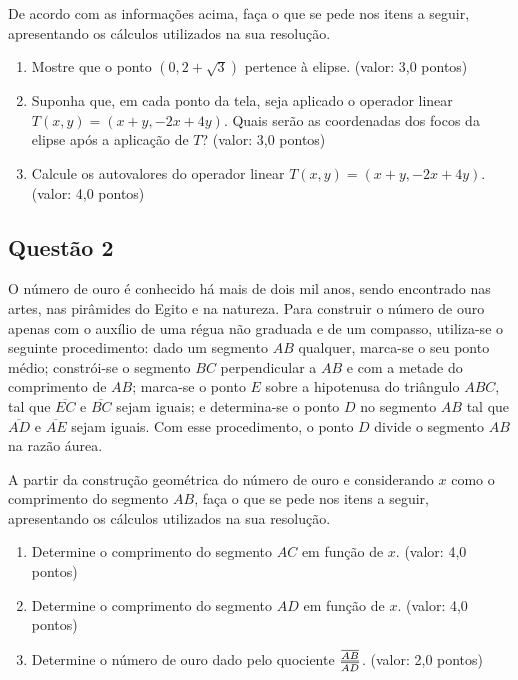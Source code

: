 \documentclass{report}
\begin{document}
De acordo com as informa\c c\~oes acima, fa\c ca o que se pede nos itens a seguir, apresentando os c\'alculos utilizados na sua resolu\c c\~ao.

\begin{enumerate}

\item[(a)] Mostre que o ponto $(0,2+\sqrt{3})$ pertence \`a elipse. (valor: 3,0 pontos)

\item[(b)] Suponha que, em cada ponto da tela, seja aplicado o operador linear $T(x,y)=(x+y,-2x+4y)$. Quais ser\~ao as coordenadas dos focos da elipse ap\'os a aplica\c c\~ao de $T$? (valor: 3,0 pontos)

\item[(c)] Calcule os autovalores do operador linear $T(x,y)=(x+y,-2x+4y)$. (valor: 4,0 pontos)

\end{enumerate}
\subsection{\color{blue} Quest\~ao 2}

O n\'umero de ouro \'e conhecido h\'a mais de dois mil anos, sendo encontrado nas artes, nas pir\^amides do Egito e na natureza. Para construir o n\'umero de ouro apenas com o aux\'ilio de uma r\'egua n\~ao graduada e de um compasso, utiliza-se o seguinte procedimento: dado um segmento $AB$ qualquer, marca-se o seu ponto m\'edio; constr\'oi-se o segmento $BC$ perpendicular a $AB$ e com a metade do comprimento de $AB$; marca-se o ponto $E$ sobre a hipotenusa do tri\^angulo $ABC$, tal que $\overline{EC}$ e $\overline{BC}$ sejam iguais; e determina-se o ponto $D$ no segmento $AB$ tal que $\overline{AD}$ e $\overline{AE}$ sejam iguais. Com esse procedimento, o ponto $D$ divide o segmento $AB$ na raz\~ao \'aurea.

A partir da constru\c c\~ao geom\'etrica do n\'umero de ouro e considerando $x$ como o comprimento do segmento $AB$, fa\c ca o que se pede nos itens a seguir, apresentando os c\'alculos utilizados na sua resolu\c c\~ao.

\begin{enumerate}

\item[(a)] Determine o comprimento do segmento $AC$ em fun\c c\~ao de $x$. (valor: 4,0 pontos)

\item[(b)] Determine o comprimento do segmento $AD$ em fun\c c\~ao de $x$. (valor: 4,0 pontos)

\item[(c)] Determine o n\'umero de ouro dado pelo quociente $\overline{AB}\over\overline{AD}$. (valor: 2,0 pontos)
\end{enumerate}
\end{document}
